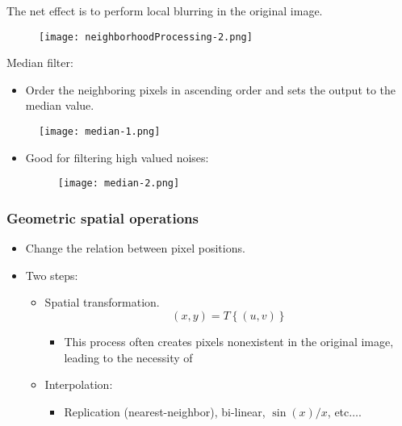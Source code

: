 
\begin{frame}
The net effect is to perform local blurring in the original image.
\begin{figure}
\centering
\texttt{[image: neighborhoodProcessing-2.png]}
\end{figure}
\end{frame}


\begin{frame}
Median filter:
\begin{itemize}
\item Order the neighboring pixels in ascending order and sets the output to the median value.
\end{itemize}
\begin{figure}
\centering
\texttt{[image: median-1.png]}
\end{figure}
\begin{itemize}
\item Good for filtering high valued noises:
\begin{figure}
\centering
\texttt{[image: median-2.png]}
\end{figure}
\end{itemize}
\end{frame}


\begin{frame}
\frametitle{Geometric spatial operations}
\begin{itemize}
\item Change the relation between pixel positions.
\item Two steps:
\begin{itemize}
\item Spatial transformation.
\begin{equation}
(x,y) = T\left \{ (u,v) \right \}
\end{equation}
\begin{itemize}
\item This process often creates pixels nonexistent in the original image, leading to the necessity of
\end{itemize}
\item Interpolation:
\begin{itemize}
\item Replication (nearest-neighbor), bi-linear, $\sin(x)/x$, etc$\ldots$.
\end{itemize}
\end{itemize}
\end{itemize}
\end{frame}

